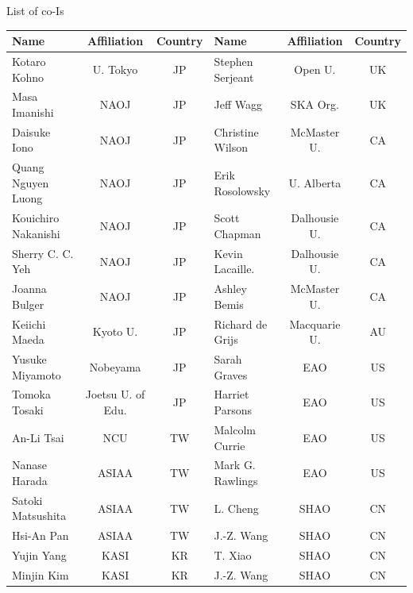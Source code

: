 \documentclass[legal,11pt]{article}
\begin{document}
\begin{table}[htbp]

\centering
{List of co-Is}
\small
\addtolength{\tabcolsep}{-1.pt}

\begin{threeparttable}[b]
\begin{tabular}{lcclcc}
\hline
\hline

Name & Affiliation & Country & Name & Affiliation & Country \\

\hline

Kotaro Kohno         & U. Tokyo          & JP & Stephen Serjeant  & Open U.       & UK  \\  
Masa Imanishi        & NAOJ              & JP & Jeff Wagg         & SKA Org.      & UK \\ 
Daisuke Iono         & NAOJ              & JP & Christine Wilson  & McMaster U.   & CA \\
Quang Nguyen Luong   & NAOJ              & JP & Erik Rosolowsky   & U. Alberta    & CA \\
Kouichiro Nakanishi  & NAOJ              & JP & Scott Chapman     & Dalhousie U.  & CA \\
Sherry C. C. Yeh     & NAOJ              & JP & Kevin Lacaille.   & Dalhousie U.  & CA \\
Joanna Bulger        & NAOJ              & JP & Ashley Bemis      & McMaster U.   & CA \\ 
Keiichi Maeda        & Kyoto U.          & JP & Richard de Grijs  & Macquarie U.  & AU  \\
Yusuke Miyamoto      & Nobeyama          & JP & Sarah Graves      & EAO           & US \\
Tomoka Tosaki        & Joetsu U. of Edu. & JP & Harriet Parsons   & EAO           & US \\
An-Li Tsai           & NCU               & TW & Malcolm Currie    & EAO           & US  \\
Nanase Harada        & ASIAA             & TW & Mark G. Rawlings  & EAO           & US  \\
Satoki Matsushita    & ASIAA             & TW & L. Cheng          & SHAO          & CN  \\
Hsi-An Pan           & ASIAA             & TW & J.-Z. Wang        & SHAO          & CN  \\ 
Yujin Yang           & KASI              & KR & T. Xiao           & SHAO          & CN  \\
Minjin Kim           & KASI              & KR & J.-Z. Wang        & SHAO          & CN \\ 

\end{tabular}
\end{threeparttable}
\end{table}
\end{document}
